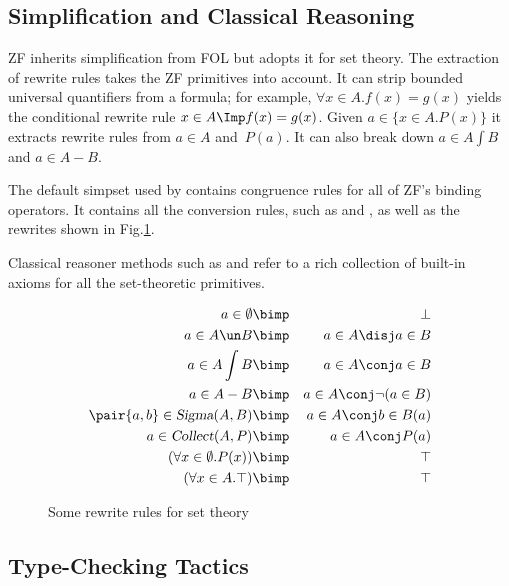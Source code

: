 \subsection{Simplification and Classical Reasoning}

ZF inherits simplification from FOL but adopts it for set theory.  The
extraction of rewrite rules takes the ZF primitives into account.  It can
strip bounded universal quantifiers from a formula; for example, ${\forall
  x\in A. f(x)=g(x)}$ yields the conditional rewrite rule $x\in A \Imp
f(x)=g(x)$.  Given $a\in\{x\in A. P(x)\}$ it extracts rewrite rules from $a\in
A$ and~$P(a)$.  It can also break down $a\in A\int B$ and $a\in A-B$.

The default simpset used by  contains congruence rules for all of ZF's
binding operators.  It contains all the conversion rules, such as
 and
, as well as the rewrites shown in Fig.\ts\ref{zf-simpdata}.

Classical reasoner methods such as  and  refer to
a rich collection of built-in axioms for all the set-theoretic
primitives.


\begin{figure}
\begin{eqnarray*}
  a\in \emptyset        & \bimp &  \bot\\
  a \in A \un B      & \bimp &  a\in A \disj a\in B\\
  a \in A \int B      & \bimp &  a\in A \conj a\in B\\
  a \in A-B             & \bimp &  a\in A \conj \lnot (a\in B)\\
  \pair{a,b}\in \isa{Sigma}(A,B)
                        & \bimp &  a\in A \conj b\in B(a)\\
  a \in \isa{Collect}(A,P)      & \bimp &  a\in A \conj P(a)\\
  (\forall x \in \emptyset. P(x)) & \bimp &  \top\\
  (\forall x \in A. \top)       & \bimp &  \top
\end{eqnarray*}
\caption{Some rewrite rules for set theory} \label{zf-simpdata}
\end{figure}


\subsection{Type-Checking Tactics}


